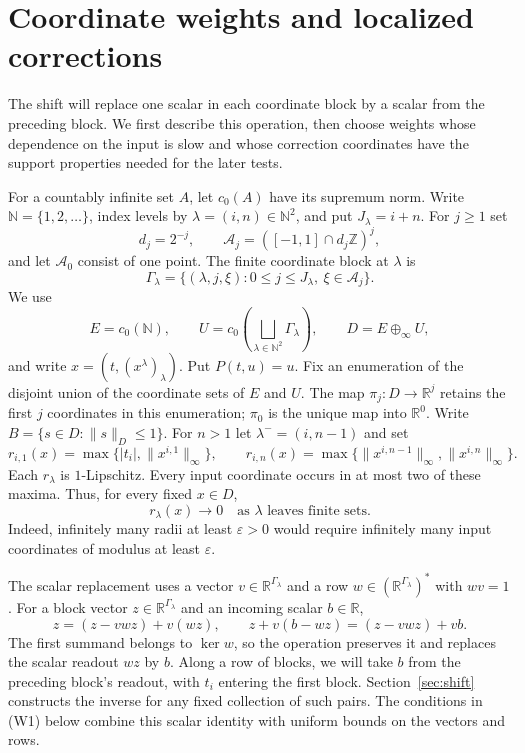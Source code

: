\section{Coordinate weights and localized corrections}\label{sec:weights}

The shift will replace one scalar in each coordinate block by a scalar
from the preceding block. We first describe this operation, then choose
weights whose dependence on the input is slow and whose correction
coordinates have the support properties needed for the later tests.

For a countably infinite set $A$, let $c_0(A)$ have its supremum norm.
Write $\mathbb N=\{1,2,\ldots\}$, index levels by
$\lambda=(i,n)\in\mathbb N^2$, and put $J_\lambda=i+n$. For $j\geq1$ set
\[
 d_j=2^{-j},\qquad
 \mathcal A_j=([-1,1]\cap d_j\mathbb Z)^j,
\]
and let $\mathcal A_0$ consist of one point. The finite coordinate block at
$\lambda$ is
\[
 \Gamma_\lambda
   =\{(\lambda,j,\xi):0\leq j\leq J_\lambda,
                              \ \xi\in\mathcal A_j\}.
\]
We use
\[
 E=c_0(\mathbb N),\qquad
 U=c_0\!\left(\bigsqcup_{\lambda\in\mathbb N^2}\Gamma_\lambda\right),
 \qquad D=E\oplus_\infty U,
\]
and write $x=(t,(x^\lambda)_\lambda)$. Put $P(t,u)=u$.
Fix an enumeration of the disjoint union of the coordinate sets of $E$
and $U$. The map $\pi_j:D\to\mathbb R^j$ retains the first $j$
coordinates in this enumeration; $\pi_0$ is the unique map into
$\mathbb R^0$. Write $B=\{s\in D:\|s\|_D\leq1\}$. For $n>1$
let $\lambda^-=(i,n-1)$ and set
\[
 r_{i,1}(x)=\max\{|t_i|,\|x^{i,1}\|_\infty\},\qquad
 r_{i,n}(x)=\max\{\|x^{i,n-1}\|_\infty,\|x^{i,n}\|_\infty\}.
\]
Each $r_\lambda$ is $1$-Lipschitz. Every input coordinate occurs in at most
two of these maxima. Thus, for every fixed $x\in D$,
\begin{equation}
 r_\lambda(x)\longrightarrow0
 \quad\text{as $\lambda$ leaves finite sets}.\label{eq:radii-tail}
\end{equation}
Indeed, infinitely many radii at least $\varepsilon>0$ would require
infinitely many input coordinates of modulus at least $\varepsilon$.

The scalar replacement uses a vector $v\in\mathbb R^{\Gamma_\lambda}$
and a row $w\in(\mathbb R^{\Gamma_\lambda})^*$ with $wv=1$.
For a block vector $z\in\mathbb R^{\Gamma_\lambda}$ and an incoming
scalar $b\in\mathbb R$,
\[
 z=(z-vwz)+v(wz),\qquad
 z+v(b-wz)=(z-vwz)+vb.
\]
The first summand belongs to $\ker w$, so the operation preserves it
and replaces the scalar readout $wz$ by $b$. Along a row of blocks,
we will take $b$ from the preceding block's readout, with $t_i$
entering the first block. Section~\ref{sec:shift} constructs the inverse
for any fixed collection of such pairs. The conditions in (W1) below
combine this scalar identity with uniform bounds on the vectors and rows.

